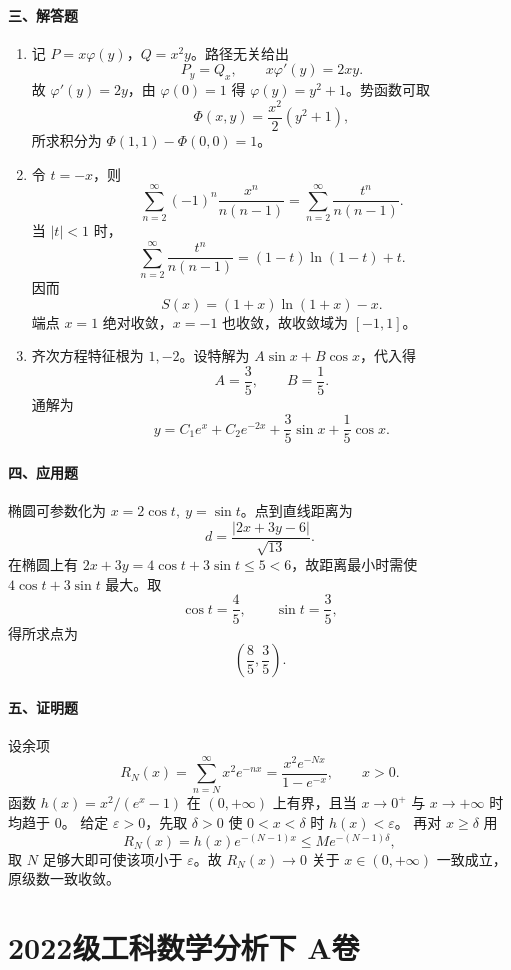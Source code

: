 \paragraph*{三、解答题}
\begin{enumerate}
  \item 记 $P=x\varphi(y)$，$Q=x^2y$。路径无关给出
  \[
    P_y=Q_x,\qquad x\varphi'(y)=2xy.
  \]
  故 $\varphi'(y)=2y$，由 $\varphi(0)=1$ 得 $\varphi(y)=y^2+1$。势函数可取
  \[
    \Phi(x,y)=\frac{x^2}{2}(y^2+1),
  \]
  所求积分为 $\Phi(1,1)-\Phi(0,0)=1$。
  \item 令 $t=-x$，则
  \[
    \sum_{n=2}^\infty(-1)^n\frac{x^n}{n(n-1)}
    =\sum_{n=2}^\infty\frac{t^n}{n(n-1)}.
  \]
  当 $|t|<1$ 时，
  \[
    \sum_{n=2}^\infty\frac{t^n}{n(n-1)}
    =(1-t)\ln(1-t)+t.
  \]
  因而
  \[
    S(x)=(1+x)\ln(1+x)-x.
  \]
  端点 $x=1$ 绝对收敛，$x=-1$ 也收敛，故收敛域为 $[-1,1]$。
  \item 齐次方程特征根为 $1,-2$。设特解为 $A\sin x+B\cos x$，代入得
  \[
    A=\frac35,\qquad B=\frac15.
  \]
  通解为
  \[
    y=C_1e^x+C_2e^{-2x}+\frac35\sin x+\frac15\cos x.
  \]
\end{enumerate}

\paragraph*{四、应用题}
椭圆可参数化为 $x=2\cos t,\ y=\sin t$。点到直线距离为
\[
  d=\frac{|2x+3y-6|}{\sqrt{13}}.
\]
在椭圆上有 $2x+3y=4\cos t+3\sin t\le5<6$，故距离最小时需使 $4\cos t+3\sin t$ 最大。取
\[
  \cos t=\frac45,\qquad \sin t=\frac35,
\]
得所求点为
\[
  \left(\frac85,\frac35\right).
\]

\paragraph*{五、证明题}
设余项
\[
  R_N(x)=\sum_{n=N}^\infty x^2e^{-nx}
  =\frac{x^2e^{-Nx}}{1-e^{-x}},\qquad x>0.
\]
函数 $h(x)=x^2/(e^x-1)$ 在 $(0,+\infty)$ 上有界，且当 $x\to0^+$ 与 $x\to+\infty$ 时均趋于 $0$。
给定 $\varepsilon>0$，先取 $\delta>0$ 使 $0<x<\delta$ 时 $h(x)<\varepsilon$。
再对 $x\ge\delta$ 用
\[
  R_N(x)=h(x)e^{-(N-1)x}\le M e^{-(N-1)\delta},
\]
取 $N$ 足够大即可使该项小于 $\varepsilon$。故 $R_N(x)\to0$ 关于 $x\in(0,+\infty)$ 一致成立，原级数一致收敛。

\section{2022级工科数学分析下 A卷}

